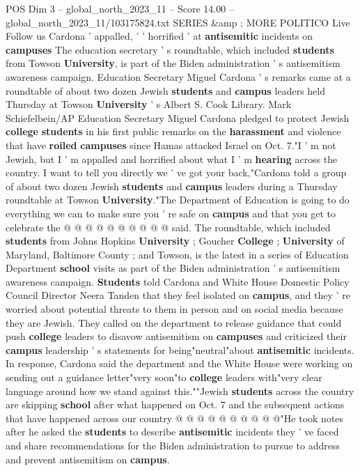 \begin{textsample}{POS Dim 3 – global\_north\_2023\_11 – Score 14.00 – global\_north\_2023\_11/103175824.txt}  \label{ex:f3_pos_172}
SERIES \&amp ; MORE POLITICO Live Follow us Cardona ' appalled, ' ' horrified ' at \textbf{antisemitic} incidents on \textbf{campuses} The education secretary ' s roundtable, which included \textbf{students} from Towson \textbf{University}, is part of the Biden administration ' s antisemitism awareness campaign.
Education Secretary Miguel Cardona ' s remarks came at a roundtable of about two dozen Jewish \textbf{students} and \textbf{campus} leaders held Thursday at Towson \textbf{University} ' s Albert S.
Cook Library.
Mark Schiefelbein/AP Education Secretary Miguel Cardona pledged to protect Jewish \textbf{college} \textbf{students} in his first public remarks on the \textbf{harassment} and violence that have \textbf{roiled} \textbf{campuses} since Hamas attacked Israel on Oct. 7."I ' m not Jewish, but I ' m appalled and horrified about what I ' m \textbf{hearing} across the country.
I want to tell you directly we ' ve got your back,"Cardona told a group of about two dozen Jewish \textbf{students} and \textbf{campus} leaders during a Thursday roundtable at Towson \textbf{University}."The Department of Education is going to do everything we can to make sure you ' re safe on \textbf{campus} and that you get to celebrate the @ @ @ @ @ @ @ @ @ @ said.
The roundtable, which included \textbf{students} from Johns Hopkins \textbf{University} ; Goucher \textbf{College} ; \textbf{University} of Maryland, Baltimore County ; and Towson, is the latest in a series of Education Department \textbf{school} visits as part of the Biden administration ' s antisemitism awareness campaign. \textbf{Students} told Cardona and White House Domestic Policy Council Director Neera Tanden that they feel isolated on \textbf{campus}, and they ' re worried about potential threats to them in person and on social media because they are Jewish.
They called on the department to release guidance that could push \textbf{college} leaders to disavow antisemitism on \textbf{campuses} and criticized their \textbf{campus} leadership ' s statements for being"neutral"about \textbf{antisemitic} incidents.
In response, Cardona said the department and the White House were working on sending out a guidance letter"very soon"to \textbf{college} leaders with"very clear language around how we stand against this.""Jewish \textbf{students} across the country are skipping \textbf{school} after what happened on Oct. 7 and the subsequent actions that have happened across our country @ @ @ @ @ @ @ @ @ @"He took notes after he asked the \textbf{students} to describe \textbf{antisemitic} incidents they ' ve faced and share recommendations for the Biden administration to pursue to address and prevent antisemitism on \textbf{campus}.

\end{textsample}
